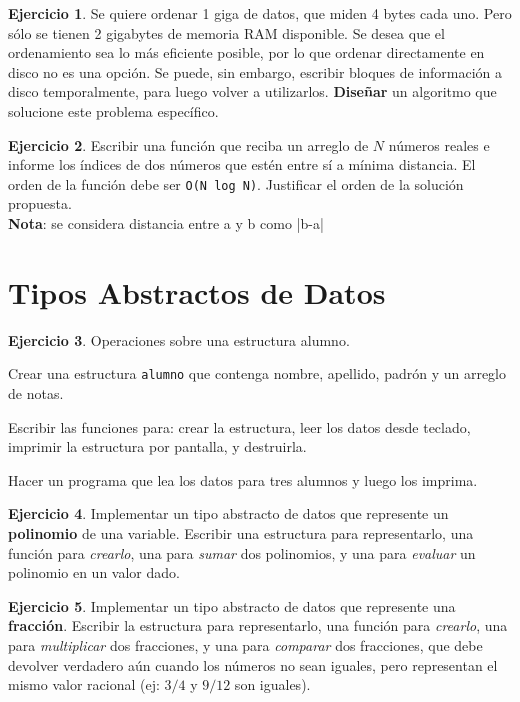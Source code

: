 \documentclass[11pt,a4paper]{article}
\theoremstyle{definition}
\newtheorem{ejercicio}{Ejercicio}[section]
\begin{document}
\begin{ejercicio}
Se quiere ordenar 1 giga de datos, que miden 4 bytes cada uno. Pero sólo se
tienen 2 gigabytes de memoria RAM disponible. Se desea que el ordenamiento
sea lo más eficiente posible, por lo que ordenar directamente en disco no
es una opción. Se puede, sin embargo, escribir bloques de información a
disco temporalmente, para luego volver a utilizarlos. \textbf{Diseñar} un
algoritmo que solucione este problema específico.
\end{ejercicio}

\begin{ejercicio}
Escribir una función que reciba un arreglo de $N$ números reales e informe
los índices de dos números que estén entre sí a mínima distancia.
El orden de la función debe ser \verb!O(N log N)!. Justificar el orden de la
solución propuesta. \\
\textbf{Nota}: se considera distancia entre a y b como |b-a|
\end{ejercicio}

\newpage
\section{Tipos Abstractos de Datos}

\begin{ejercicio}
Operaciones sobre una estructura alumno.
\begin{partes}
\item Crear una estructura \lstinline!alumno! que contenga nombre, apellido, padrón y un arreglo
de notas.
\item Escribir las funciones para: crear la estructura, leer los datos
desde teclado, imprimir la estructura por pantalla, y destruirla.
\item Hacer un programa que lea los datos para tres alumnos y luego los imprima.
\end{partes}
\end{ejercicio}

\begin{ejercicio}
Implementar un tipo abstracto de datos que represente un \textbf{polinomio}
de una variable. Escribir una estructura para representarlo, una función
para \textit{crearlo}, una para \textit{sumar} dos polinomios, y una para
\textit{evaluar} un polinomio en un valor dado.
\end{ejercicio}

\begin{ejercicio}
Implementar un tipo abstracto de datos que represente una
\textbf{fracción}. Escribir la estructura para representarlo, una función
para \textit{crearlo}, una para \textit{multiplicar} dos fracciones, y una
para \textit{comparar} dos fracciones, que debe devolver verdadero aún
cuando los números no sean iguales, pero representan el mismo valor
racional (ej: $3/4$ y $9/12$ son iguales).
\end{ejercicio}
\end{document}

